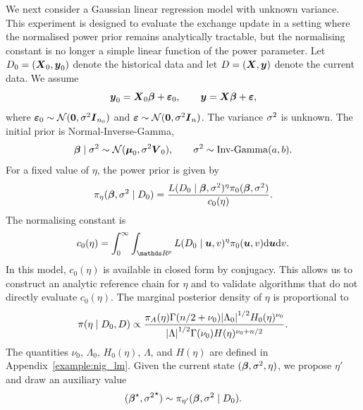 We next consider a Gaussian linear regression model with unknown variance.
This experiment is designed to evaluate the exchange update in a setting where the normalised power prior remains analytically tractable, but the normalising constant is no longer a simple linear function of the power parameter.
Let $D_0 = (\boldsymbol{X}_0,\boldsymbol{y}_0)$ denote the historical data and let $D = (\boldsymbol{X},\boldsymbol{y})$ denote the current data.
We assume
\begin{equation}
    \boldsymbol{y}_0 = \boldsymbol{X}_0 \boldsymbol{\beta} + \boldsymbol{\varepsilon}_0,
    \qquad
    \boldsymbol{y} = \boldsymbol{X} \boldsymbol{\beta} + \boldsymbol{\varepsilon},
\end{equation}
where $\boldsymbol{\varepsilon}_0 \sim \mathcal{N}(\boldsymbol{0},\sigma^2 \boldsymbol{I}_{n_0})$ and $\boldsymbol{\varepsilon} \sim \mathcal{N}(\boldsymbol{0},\sigma^2 \boldsymbol{I}_n)$.
The variance $\sigma^2$ is unknown.
The initial prior is Normal-Inverse-Gamma,
\begin{equation}
    \boldsymbol{\beta} \mid \sigma^2 \sim \mathcal{N}(\boldsymbol{\mu}_0,\sigma^2 \boldsymbol{V}_0),
    \qquad
    \sigma^2 \sim \operatorname{Inv-Gamma}(a,b).
\end{equation}
For a fixed value of $\eta$, the power prior is given by
\begin{equation}
    \pi_{\eta}(\boldsymbol{\beta},\sigma^2 \mid D_0)
    =
    \frac{
        L(D_0 \mid \boldsymbol{\beta},\sigma^2)^\eta \pi_0(\boldsymbol{\beta},\sigma^2)
    }{
        c_0(\eta)
    }.
\end{equation}
The normalising constant is
\begin{equation}
    c_0(\eta)
    =
    \int_0^\infty
    \int_{\bR^p}
    L(D_0 \mid \bfu,v)^\eta
    \pi_0(\bfu,v)
    \dd \bfu
    \dd v.
\end{equation}
In this model, $c_0(\eta)$ is available in closed form by conjugacy.
This allows us to construct an analytic reference chain for $\eta$ and to validate algorithms that do not directly evaluate $c_0(\eta)$.
The marginal posterior density of $\eta$ is proportional to
\begin{equation}
    \pi(\eta \mid D_0,D)
    \propto
    \frac{
        \pi_A(\eta)
        \Gamma(n/2+\nu_0)
        \abs{\Lambda_0}^{1/2}
        H_0(\eta)^{\nu_0}
    }{
        \abs{\Lambda}^{1/2}
        \Gamma(\nu_0)
        H(\eta)^{\nu_0+n/2}
    }.
    \label{eq:nig-lm-eta-marginal}
\end{equation}
The quantities $\nu_0$, $\Lambda_0$, $H_0(\eta)$, $\Lambda$, and $H(\eta)$ are defined in Appendix~\ref{example:nig_lm}.
Given the current state $(\boldsymbol{\beta},\sigma^2,\eta)$, we propose $\eta'$ and draw an auxiliary value
\begin{equation}
    ({\boldsymbol{\beta}}^\star,{\sigma^2}^\star)
    \sim
    \pi_{\eta'}(\boldsymbol{\beta},\sigma^2 \mid D_0).
\end{equation}

